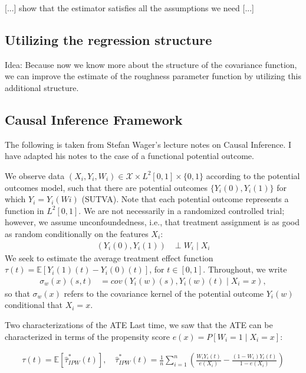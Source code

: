 \begin{proposition}{}
    [...] show that the estimator satisfies all the assumptions we need [...]
\end{proposition}


\subsection{Utilizing the regression structure}

Idea: Because now we know more about the structure of the covariance function, we can
improve the estimate of the roughness parameter function by utilizing this additional
structure.


\subsection{Causal Inference Framework}

The following is taken from Stefan Wager's lecture notes on Causal Inference. I have
adapted his notes to the case of a functional potential outcome.

We observe data $(X_i, Y_i, W_i) \in \mathcal{X} \times L^2[0, 1] \times \{0, 1\}$
according to the potential outcomes model, such that there are potential outcomes
$\{Y_i(0), Y_i(1)\}$ for which $Y_i = Y_i(Wi)$ (SUTVA). Note that each potential outcome
represents a function in $L^2[0, 1]$. We are not necessarily in a randomized controlled
trial; however, we assume unconfoundedness, i.e., that treatment assignment is as good
as random conditionally on the features $X_i$:
\begin{align}
    (Y_i(0), Y_i(1)) &\perp W_i \mid X_i
\end{align}
We seek to estimate the average treatment effect function $\tau(t) =
\mathbb{E}[Y_i(1)(t) - Y_i(0)(t)]$, for $t \in [0, 1]$.
Throughout, we write
\begin{align}
    \sigma_w(x)(s, t) &= cov(Y_i(w)(s), Y_i(w)(t) \mid X_i = x),
\end{align}
so that $\sigma_w(x)$ refers to the covariance kernel of the potential outcome $Y_i(w)$
conditional that $X_i = x$.

Two characterizations of the ATE Last time, we saw that the ATE can
be characterized in terms of the propensity score $e(x) = P[W_i = 1 \mid X_i = x]$:

\begin{align*}
    \tau(t) = \mathbb{E}[\hat{\tau}_{IPW}^\ast(t)], \quad \hat{\tau}_{IPW}^\ast(t) =
    \frac{1}{n} \sum_{i=1}^n (\frac{W_i Y_i(t)}{e(X_i)} - \frac{(1 - W_i)Y_i(t)}{1
    - e(X_i)})
\end{align*}

